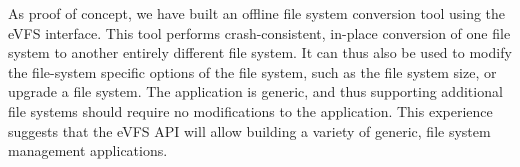 As proof of concept, we have built an offline file system conversion tool using the eVFS interface. This tool performs crash-consistent, in-place conversion of one file system to another entirely different file system. It can thus also be used to modify the file-system specific options of the file system, such as the file system size, or upgrade a file system. The application is generic, and thus supporting additional file systems should require no modifications to the application. This experience suggests that the eVFS API will allow building a variety of generic, file system management applications.



